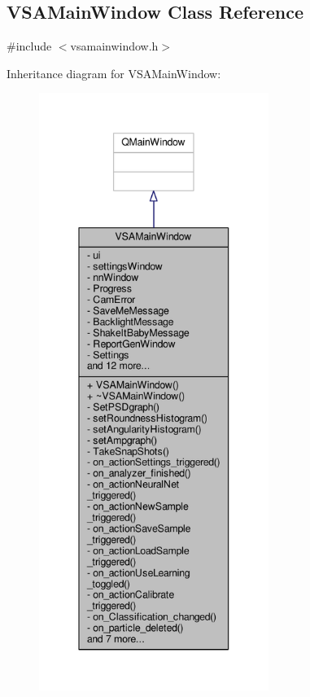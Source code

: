 \hypertarget{class_v_s_a_main_window}{}\subsection{V\+S\+A\+Main\+Window Class Reference}
\label{class_v_s_a_main_window}


{\ttfamily \#include $<$vsamainwindow.\+h$>$}



Inheritance diagram for V\+S\+A\+Main\+Window\+:
\nopagebreak
\begin{figure}[H]
\begin{center}
\leavevmode
\includegraphics[height=550pt]{class_v_s_a_main_window__inherit__graph}
\end{center}
\end{figure}


